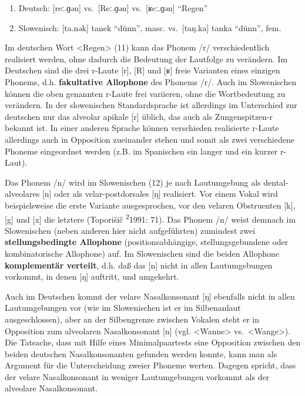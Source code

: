 \documentclass[
  letterpaper,
]{scrbook}
\providecommand{\tightlist}{%
  \setlength{\itemsep}{0pt}\setlength{\parskip}{0pt}}\usepackage{longtable,booktabs,array}
\begin{document}
\begin{enumerate}
\def\labelenumi{(\arabic{enumi})}
\setcounter{enumi}{10}
\tightlist
\item
  Deutsch: {[}reː.ɡən{]} vs.~{[}Reː.ɡən{]} vs.~{[}ʁeː.ɡən{]} ``Regen''
\item
  Slowenisch: {[}ta.nək{]} tanek ``dünn'', masc. vs.~{[}taŋ.ka{]} tanka
  ``dünn'', fem.
\end{enumerate}

Im deutschen Wort \textless Regen\textgreater{} (11) kann das Phonem /r/
verschiedentlich realisiert werden, ohne dadurch die Bedeutung der
Lautfolge zu verändern. Im Deutschen sind die drei r-Laute {[}r{]},
{[}R{]} und {[}ʁ{]} freie Varianten eines einzigen Phonems, d.h.
\textbf{fakultative Allophone} des Phonems /r/. Auch im Slowenischen
können die oben genannten r-Laute frei variieren, ohne die Wortbedeutung
zu verändern. In der slowenischen Standardsprache ist allerdings im
Unterschied zur deutschen nur das alveolar apikale {[}r{]} üblich, das
auch als Zungenspitzen-r bekannt ist. In einer anderen Sprache können
verschieden realisierte r-Laute allerdings auch in Opposition zueinander
stehen und somit als zwei verschiedene Phoneme eingeordnet werden (z.B.
im Spanischen ein langer und ein kurzer r-Laut).

Das Phonem /n/ wird im Slowenischen (12) je nach Lautumgebung als
dental-alveolares {[}n{]} oder als velar-postdorsales {[}ŋ{]}
realisiert. Vor einem Vokal wird beispielsweise die erste Variante
ausgesprochen, vor den velaren Obstruenten {[}k{]}, {[}g{]} und {[}x{]}
die letztere (Toporišič \textsuperscript{2}1991: 71). Das Phonem /n/
weist demnach im Slowenischen (neben anderen hier nicht aufgeführten)
zumindest zwei \textbf{stellungsbedingte Allophone} (positionsabhängige,
stellungsgebundene oder kombinatorische Allophone) auf. Im Slowenischen
sind die beiden Allophone \textbf{komplementär verteilt}, d.h. daß das
{[}n{]} nicht in allen Lautumgebungen vorkommt, in denen {[}ŋ{]}
auftritt, und umgekehrt.

Auch im Deutschen kommt der velare Nasalkonsonant {[}ŋ{]} ebenfalls
nicht in allen Lautumgebungen vor (wie im Slowenischen ist er im
Silbenanlaut ausgeschlossen), aber an der Silbengrenze zwischen Vokalen
steht er in Opposition zum alveolaren Nasalkonsonant {[}n{]} (vgl.
\textless Wanne\textgreater{} vs.~\textless Wange\textgreater). Die
Tatsache, dass mit Hilfe eines Minimalpaartests eine Opposition zwischen
den beiden deutschen Nasalkonsonanten gefunden werden konnte, kann man
als Argument für die Unterscheidung zweier Phoneme werten. Dagegen
spricht, dass der velare Nasalkonsonant in weniger Lautumgebungen
vorkommt als der alveolare Nasalkonsonant.
\end{document}
